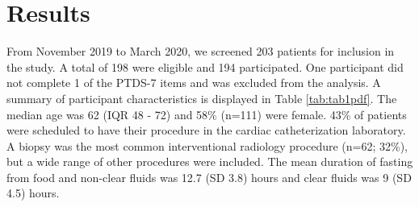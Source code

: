 \documentclass[12pt,twocolumn,twoside,]{pinp}
\begin{document}
\hypertarget{results}{%
\section{Results}\label{results}}

From November 2019 to March 2020, we screened 203 patients for inclusion
in the study. A total of 198 were eligible and 194 participated. One
participant did not complete 1 of the PTDS-7 items and was excluded from
the analysis. A summary of participant characteristics is displayed in
Table \ref{tab:tab1pdf}. The median age was 62 (IQR 48 - 72) and 58\%
(n=111) were female. 43\% of patients were scheduled to have their
procedure in the cardiac catheterization laboratory. A biopsy was the
most common interventional radiology procedure (n=62; 32\%), but a wide
range of other procedures were included. The mean duration of fasting
from food and non-clear fluids was 12.7 (SD 3.8) hours and clear fluids
was 9 (SD 4.5) hours.
\end{document}
